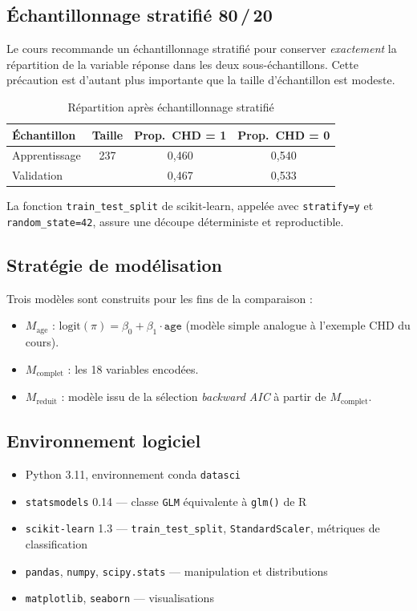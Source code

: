 \documentclass[11pt,a4paper,twoside]{report}
\newcommand{\logit}{\mathrm{logit}}
\theoremstyle{definition}
\begin{document}
\subsection{Échantillonnage stratifié 80\,/\,20}

Le cours recommande un échantillonnage stratifié pour conserver
\emph{exactement} la répartition de la variable réponse dans les deux
sous-échantillons. Cette précaution est d'autant plus importante que la
taille d'échantillon est modeste.

\begin{table}[H]
\centering
\caption{Répartition après échantillonnage stratifié}
\label{tab:strat}
\begin{tabular}{lccc}
\toprule
Échantillon & Taille & Prop.\ CHD = 1 & Prop.\ CHD = 0 \\
\midrule
Apprentissage & 237 & 0,460 & 0,540 \\
Validation    & \;60 & 0,467 & 0,533 \\
\bottomrule
\end{tabular}
\end{table}

La fonction \texttt{train\_test\_split} de scikit-learn, appelée avec
\texttt{stratify=y} et \texttt{random\_state=42}, assure une découpe
déterministe et reproductible.

\subsection{Stratégie de modélisation}

Trois modèles sont construits pour les fins de la comparaison :
\begin{itemize}\itemsep0.2em
  \item $M_{\text{age}}$ : \quad $\logit(\pi) = \beta_0 + \beta_1 \cdot \texttt{age}$
    (modèle simple analogue à l'exemple CHD du cours).
  \item $M_{\text{complet}}$ : \quad les 18 variables encodées.
  \item $M_{\text{reduit}}$ : \quad modèle issu de la sélection
    \emph{backward AIC} à partir de $M_{\text{complet}}$.
\end{itemize}

\subsection{Environnement logiciel}

\begin{itemize}\itemsep0.2em
  \item Python 3.11, environnement conda \texttt{datasci}
  \item \texttt{statsmodels} 0.14 --- classe \texttt{GLM} équivalente à
    \texttt{glm()} de R
  \item \texttt{scikit-learn} 1.3 --- \texttt{train\_test\_split},
    \texttt{StandardScaler}, métriques de classification
  \item \texttt{pandas}, \texttt{numpy}, \texttt{scipy.stats} ---
    manipulation et distributions
  \item \texttt{matplotlib}, \texttt{seaborn} --- visualisations
\end{itemize}
\end{document}
